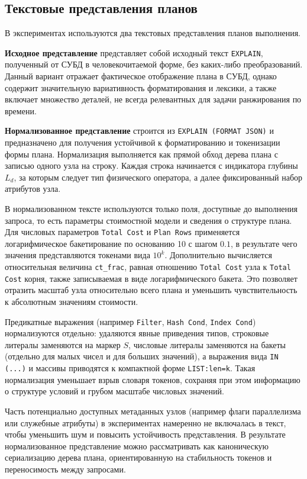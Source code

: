 \subsection{Текстовые представления планов}
\label{subsec:plan_text_repr}

В экспериментах используются два текстовых представления планов выполнения.

\textbf{Исходное представление} представляет собой исходный текст \texttt{EXPLAIN}, полученный от СУБД в человекочитаемой форме, без каких-либо преобразований. Данный вариант отражает фактическое отображение плана в СУБД, однако содержит значительную вариативность форматирования и лексики, а также включает множество деталей, не всегда релевантных для задачи ранжирования по времени.

\textbf{Нормализованное представление} строится из \texttt{EXPLAIN (FORMAT JSON)} и предназначено для получения устойчивой к форматированию и токенизации формы плана. Нормализация выполняется как прямой обход дерева плана с записью одного узла на строку. Каждая строка начинается с индикатора глубины \(L_d\), за которым следует тип физического оператора, а далее фиксированный набор атрибутов узла.

В нормализованном тексте используются только поля, доступные до выполнения запроса, то есть параметры стоимостной модели и сведения о структуре плана. Для числовых параметров \texttt{Total Cost} и \texttt{Plan Rows} применяется логарифмическое бакетирование по основанию 10 с шагом \(0.1\), в результате чего значения представляются токенами вида \(10^{k}\). Дополнительно вычисляется относительная величина \texttt{ct\_frac}, равная отношению \texttt{Total Cost} узла к \texttt{Total Cost} корня, также записываемая в виде логарифмического бакета. Это позволяет отразить масштаб узла относительно всего плана и уменьшить чувствительность к абсолютным значениям стоимости.

Предикатные выражения (например \texttt{Filter}, \texttt{Hash Cond}, \texttt{Index Cond}) нормализуются отдельно: удаляются явные приведения типов, строковые литералы заменяются на маркер \(S\), числовые литералы заменяются на бакеты (отдельно для малых чисел и для больших значений), а выражения вида \texttt{IN (...)} и массивы приводятся к компактной форме \texttt{LIST:len=k}. Такая нормализация уменьшает взрыв словаря токенов, сохраняя при этом информацию о структуре условий и грубом масштабе числовых значений.

Часть потенциально доступных метаданных узлов (например флаги параллелизма или служебные атрибуты) в экспериментах намеренно не включалась в текст, чтобы уменьшить шум и повысить устойчивость представления. В результате нормализованное представление можно рассматривать как каноническую сериализацию дерева плана, ориентированную на стабильность токенов и переносимость между запросами.

